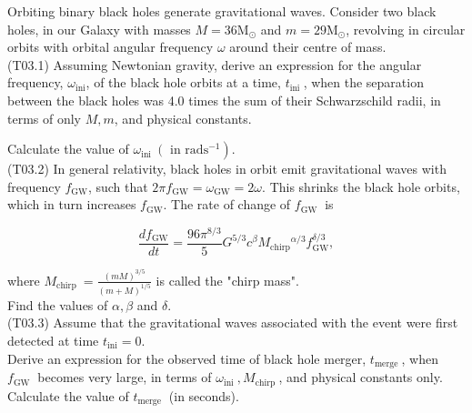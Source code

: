 \documentclass[10pt]{article}
\begin{document}
    Orbiting binary black holes generate gravitational waves. Consider two black holes, in our Galaxy with masses $M=36 \mathrm{M}_{\odot}$ and $m=29 \mathrm{M}_{\odot}$, revolving in circular orbits with orbital angular frequency $\omega$ around their centre of mass.\\
    (T03.1) Assuming Newtonian gravity, derive an expression for the angular frequency, $\omega_{\mathrm{ini}}$, of the black hole orbits at a time, $t_{\text {ini }}$, when the separation between the black holes was 4.0 times the sum of their Schwarzschild radii, in terms of only $M, m$, and physical constants.
    
    Calculate the value of $\omega_{\text {ini }}\left(\right.$ in $\left.\mathrm{rad} \mathrm{s}^{-1}\right)$.\\
    (T03.2) In general relativity, black holes in orbit emit gravitational waves with frequency $f_{\mathrm{GW}}$, such that $2 \pi f_{\mathrm{GW}}=\omega_{\mathrm{GW}}=2 \omega$. This shrinks the black hole orbits, which in turn increases $f_{\mathrm{GW}}$. The rate of change of $f_{\text {GW }}$ is
    
    $$
    \frac{d f_{\mathrm{GW}}}{d t}=\frac{96 \pi^{8 / 3}}{5} G^{5 / 3} c^{\beta} M_{\mathrm{chirp}}{ }^{\alpha / 3} f_{\mathrm{GW}}^{\delta / 3},
    $$
    
    where $M_{\text {chirp }}=\frac{(m M)^{3 / 5}}{(m+M)^{1 / 5}}$ is called the "chirp mass".\\
    Find the values of $\alpha, \beta$ and $\delta$.\\
    (T03.3) Assume that the gravitational waves associated with the event were first detected at time $t_{\mathrm{ini}}=0$.\\
    Derive an expression for the observed time of black hole merger, $t_{\text {merge }}$, when $f_{\text {GW }}$ becomes very large, in terms of $\omega_{\text {ini }}, M_{\text {chirp }}$, and physical constants only. Calculate the value of $t_{\text {merge }}$ (in seconds).
\end{document}
